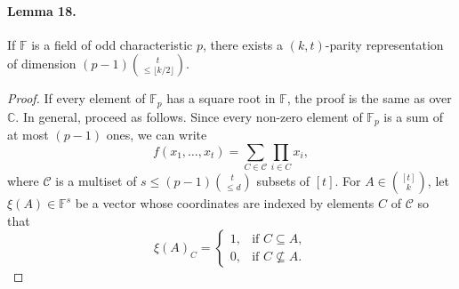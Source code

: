 \paragraph{Lemma 18.} If $\mathbb F$ is a field of odd characteristic $p$, there exists a $(k,t)$-parity representation of dimension $(p-1)\binom t{\le\lfloor k/2\rfloor}$.
\begin{proof}
If every element of $\mathbb F_p$ has a square root in $\mathbb F$, the proof is the same as over $\mathbb C$. In general, proceed as follows. Since every non-zero element of $\mathbb F_p$ is a sum of at most $(p-1)$ ones, we can write
\[f(x_1,\ldots,x_t)=\sum_{C\in\mathcal C}\prod_{i\in C}x_i,\]
where $\mathcal C$ is a multiset of $s\le(p-1)\binom t{\le d}$ subsets of $[t]$. For $A\in\binom{[t]}k$, let $\xi(A)\in\mathbb F^s$ be a vector whose coordinates are indexed by elements $C$ of $\mathcal C$ so that
\[\xi(A)_C=\begin{cases}1,&\text{if }C\subseteq A,\\0,&\text{if }C\not\subseteq A.\end{cases}\]
\end{proof}
